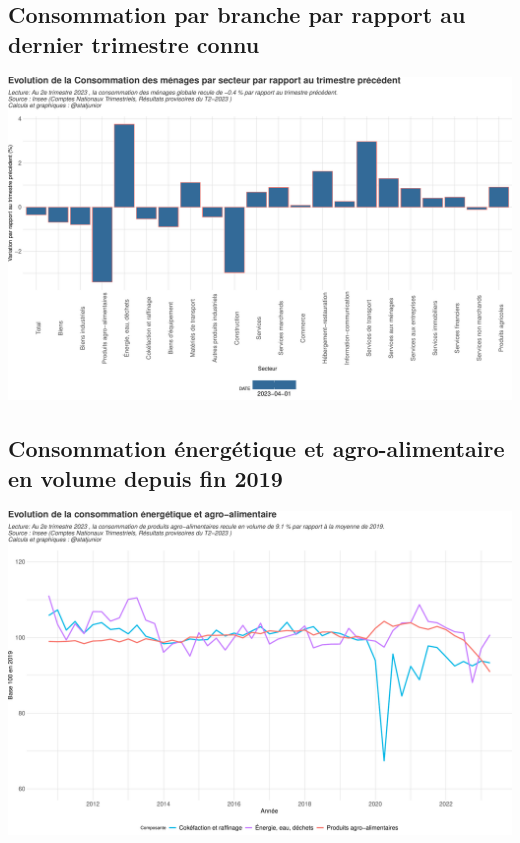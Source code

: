\documentclass[
  paper=a4,
  ,captions=tableheading
]{scrartcl}
\begin{document}
\hypertarget{consommation-par-branche-par-rapport-au-dernier-trimestre-connu}{%
\subsection{Consommation par branche par rapport au dernier trimestre
connu}\label{consommation-par-branche-par-rapport-au-dernier-trimestre-connu}}

\includegraphics{rapport_pdf_compte_branche_files/figure-latex/unnamed-chunk-11-1.pdf}

\hypertarget{consommation-uxe9nerguxe9tique-et-agro-alimentaire-en-volume-depuis-fin-2019}{%
\subsection{Consommation énergétique et agro-alimentaire en volume
depuis fin
2019}\label{consommation-uxe9nerguxe9tique-et-agro-alimentaire-en-volume-depuis-fin-2019}}

\includegraphics{rapport_pdf_compte_branche_files/figure-latex/unnamed-chunk-12-1.pdf}
\end{document}
